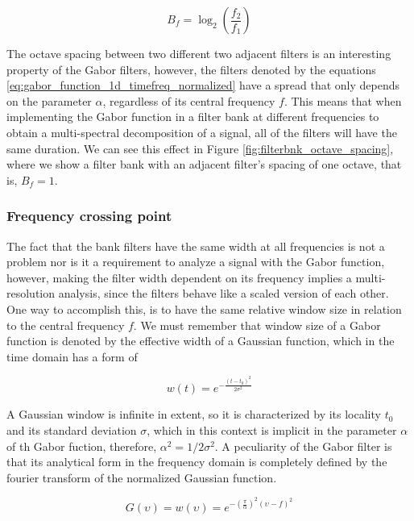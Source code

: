 \begin{equation}\label{eq:octave_spacing}
    B_f = \log_2 \left( \frac{f_2}{f_1} \right)
\end{equation}

The octave spacing between two different two adjacent filters is an interesting property of the Gabor filters, however, the filters denoted by the equations \eqref{eq:gabor_function_1d_timefreq_normalized} have a spread that only depends on the parameter $\alpha$, regardless of its central frequency $f$. This means that when implementing the Gabor function in a filter bank at different frequencies to obtain a multi-spectral decomposition of a signal, all of the filters will have the same duration. We can see this effect in Figure \ref{fig:filterbnk_octave_spacing}, where we show a filter bank with an adjacent filter's spacing of one octave, that is, $B_f = 1$. 


\subsubsection{Frequency crossing point}

The fact that the bank filters have the same width at all frequencies is not a problem nor is it a requirement to analyze a signal with the Gabor function, however, making the filter width dependent on its frequency implies a multi-resolution analysis, since the filters behave like a scaled version of each other. One way to accomplish this, is to have the same relative window size in relation to the central frequency $f$. We must remember that window size of a Gabor function is denoted by the effective width of a Gaussian function, which in the time domain has a form of

\begin{equation}\label{eq:1d_gaussian_function_time}
    w(t)=e^{-\frac{(t-t_0)^2}{2\sigma^2}}
\end{equation}

A Gaussian window is infinite in extent, so it is characterized by its locality $t_0$ and its standard deviation $\sigma$, which in this context is implicit in the parameter $\alpha$ of th Gabor fuction, therefore, $\alpha^2 = 1 / 2 \sigma^2$. 
A peculiarity of the Gabor filter is that its analytical form in the frequency domain is completely defined by the fourier transform of the normalized Gaussian function.

\begin{equation}\label{eq:1d_gaussian_function_freq}
    G(\upsilon) = w(\upsilon) = e ^{-\left(\frac{\pi}{\alpha}\right) ^{2} (\upsilon-f)^2}
\end{equation}

